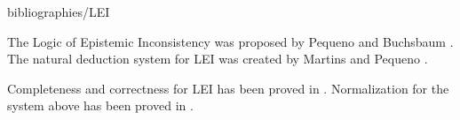 \begin{entry}{bibliographies/LEI}
\begin{history}
The Logic of Epistemic Inconsistency was proposed by Pequeno and Buchsbaum \cite{pequeno1991}. The natural deduction system for LEI was created by Martins and Pequeno \cite{martins1993}.
\end{history}




\begin{technicalities}
Completeness and correctness for LEI has been proved in \cite{martins1997}. Normalization for the system above has been proved in \cite{martins2007}.
\end{technicalities}


%
%
%
%
%
%
% 
%












\end{entry}
